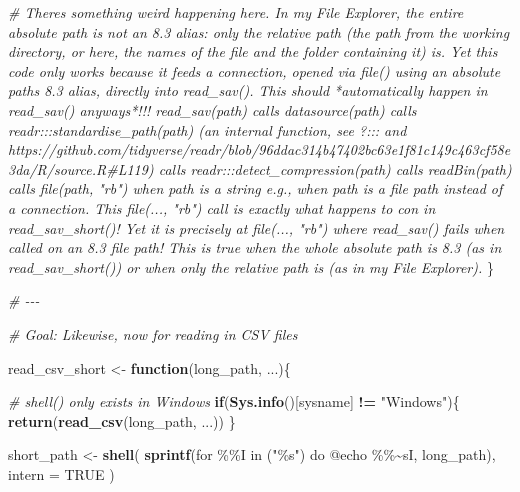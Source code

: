 \documentclass[
]{article}
\newenvironment{Shaded}{\begin{snugshade}}{\end{snugshade}}
\newcommand{\AttributeTok}[1]{\textcolor[rgb]{0.13,0.29,0.53}{#1}}
\newcommand{\CommentTok}[1]{\textcolor[rgb]{0.56,0.35,0.01}{\textit{#1}}}
\newcommand{\ConstantTok}[1]{\textcolor[rgb]{0.56,0.35,0.01}{#1}}
\newcommand{\ControlFlowTok}[1]{\textcolor[rgb]{0.13,0.29,0.53}{\textbf{#1}}}
\newcommand{\FunctionTok}[1]{\textcolor[rgb]{0.13,0.29,0.53}{\textbf{#1}}}
\newcommand{\NormalTok}[1]{#1}
\newcommand{\OtherTok}[1]{\textcolor[rgb]{0.56,0.35,0.01}{#1}}
\newcommand{\SpecialCharTok}[1]{\textcolor[rgb]{0.81,0.36,0.00}{\textbf{#1}}}
\newcommand{\StringTok}[1]{\textcolor[rgb]{0.31,0.60,0.02}{#1}}
\begin{document}
\begin{Shaded}
\begin{Highlighting}[]
  \CommentTok{\# There\textquotesingle{}s something weird happening here. In my File Explorer, the entire absolute path is not an 8.3 alias: only the relative path (the path from the working directory, or here, the names of the file and the folder containing it) is. Yet this code only works because it feeds a connection, opened via file() using an absolute path\textquotesingle{}s 8.3 alias, directly into read\_sav(). This should *automatically happen in read\_sav() anyways*!!! read\_sav(path) calls datasource(path) calls readr:::standardise\_path(path) (an internal function, see ?\textasciigrave{}:::\textasciigrave{} and https://github.com/tidyverse/readr/blob/96ddac314b47402bc63e1f81c149c463cf58e3da/R/source.R\#L119) calls readr:::detect\_compression(path) calls readBin(path) calls file(path, "rb") when \textquotesingle{}path\textquotesingle{} is a string e.g., when \textquotesingle{}path\textquotesingle{} is a file path instead of a connection. This file(..., "rb") call is exactly what happens to \textquotesingle{}con\textquotesingle{} in read\_sav\_short()! Yet it is precisely at file(..., "rb") where read\_sav() fails when called on an 8.3 file path! This is true when the whole absolute path is 8.3 (as in read\_sav\_short()) or when only the relative path is (as in my File Explorer).}
\NormalTok{\}}

\CommentTok{\# {-}{-}{-}}

\CommentTok{\# Goal: Likewise, now for reading in CSV files}

\NormalTok{read\_csv\_short }\OtherTok{\textless{}{-}} \ControlFlowTok{function}\NormalTok{(long\_path, ...)\{}
  
  \CommentTok{\# shell() only exists in Windows}
  \ControlFlowTok{if}\NormalTok{(}\FunctionTok{Sys.info}\NormalTok{()[}\StringTok{\textquotesingle{}sysname\textquotesingle{}}\NormalTok{] }\SpecialCharTok{!=} \StringTok{"Windows"}\NormalTok{)\{}
    \FunctionTok{return}\NormalTok{(}\FunctionTok{read\_csv}\NormalTok{(long\_path, ...))}
\NormalTok{  \}}
  
\NormalTok{  short\_path }\OtherTok{\textless{}{-}} \FunctionTok{shell}\NormalTok{(}
    \FunctionTok{sprintf}\NormalTok{(}\StringTok{\textquotesingle{}for \%\%I in ("\%s") do @echo \%\%\textasciitilde{}sI\textquotesingle{}}\NormalTok{, long\_path),}
    \AttributeTok{intern =} \ConstantTok{TRUE}
\NormalTok{  )}
  

\end{Highlighting}
\end{Shaded}
\end{document}
